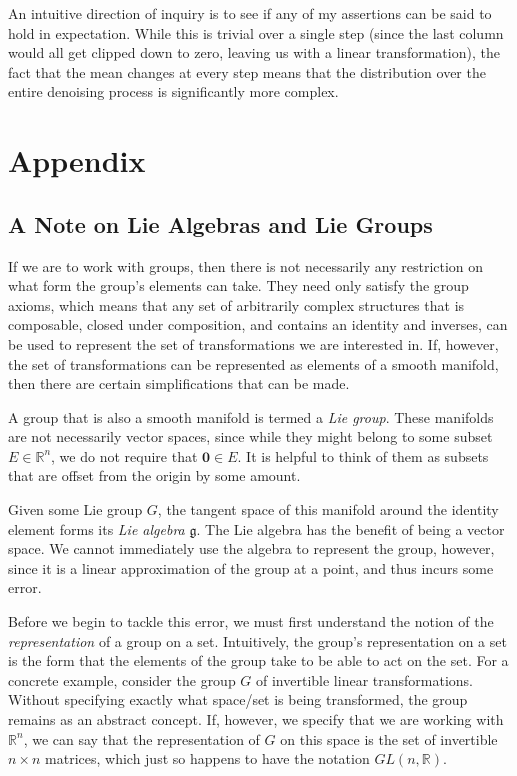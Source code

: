 \documentclass[10pt]{article} %
\begin{document}
An intuitive direction of inquiry is to see if any of my assertions can be said to hold in expectation. While this is trivial over a single step (since the last column would all get clipped down to zero, leaving us with a linear transformation), the fact that the mean changes at every step means that the distribution over the entire denoising process is significantly more complex.






\appendix
\section{Appendix}

 \subsection{A Note on Lie Algebras and Lie Groups}
 \label{app:lie_groups}
 If we are to work with groups, then there is not necessarily any restriction on what form the group's elements can take. They need only satisfy the group axioms, which means that any set of arbitrarily complex structures that is composable, closed under composition,  and contains an identity and inverses, can be used to represent the set of transformations we are interested in. If, however, the set of transformations can be represented as elements of a smooth manifold, then there are certain simplifications that can be made.

 A group that is also a smooth manifold is termed a \textit{Lie group}. These manifolds are not necessarily vector spaces, since while they might belong to some subset $E \in \mathbb{R}^n$, we do not require that $\mathbf{0} \in E$. It is helpful to think of them as subsets that are offset from the origin by some amount.

 Given some Lie group $G$, the tangent space of this manifold around the identity element forms its \textit{Lie algebra} $\mathfrak{g}$. The Lie algebra has the benefit of being a vector space. We cannot immediately use the algebra to represent the group, however, since it is a linear approximation of the group at a point, and thus incurs some error.

 Before we begin to tackle this error, we must first understand the notion of the \textit{representation} of a group on a set. Intuitively, the group's representation on a set is the form that the elements of the group take to be able to act on the set. For a concrete example, consider the group $G$ of invertible linear transformations. Without specifying exactly what space/set is being transformed, the group remains as an abstract concept. If, however, we specify that we are working with $\mathbb{R}^n$, we can say that the representation of $G$ on this space is the set of invertible $n \times n$ matrices, which just so happens to have the notation $GL(n, \mathbb{R})$.
\end{document}

